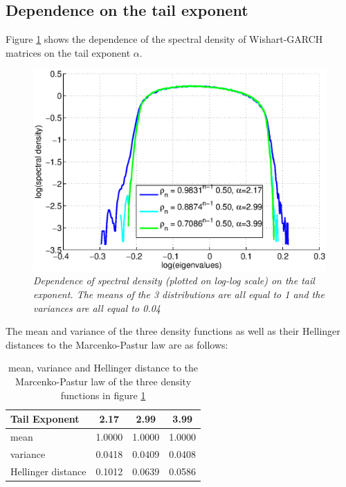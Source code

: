 \documentclass{article}
\begin{document}
\subsection{Dependence on the tail exponent}
Figure \ref{fig:spectral_density1} shows the dependence of the
spectral density of Wishart-GARCH matrices on the tail exponent
$\alpha$.
\begin{figure}[htb!]
  \centering
    \includegraphics[scale=0.4]{../pics/spectral_density1.eps}
    \caption{\small \it Dependence of spectral density (plotted on
      log-log scale) on the tail exponent. The means of the 3
      distributions are all equal to 1 and the variances are all equal
      to 0.04}
    \label{fig:spectral_density1}
\end{figure}
The mean and variance of the three density functions as well as their
Hellinger distances to the Marcenko-Pastur law are as follows:
\begin{table}[htb!]
  \centering
  \begin{tabular}{|l|c|c|c|}
    \hline
    Tail Exponent & 2.17 & 2.99 & 3.99 \\
    \hline
    mean & 1.0000 & 1.0000 & 1.0000 \\
    \hline
    variance & 0.0418 & 0.0409 & 0.0408 \\
    \hline
    Hellinger distance & 0.1012 & 0.0639 & 0.0586 \\
    \hline
  \end{tabular}
  \caption{mean, variance and Hellinger distance to the
    Marcenko-Pastur law of the three density functions in figure
    \ref{fig:spectral_density1}}
  \label{tab:spectral_density_hellinger}
\end{table}
\end{document}
